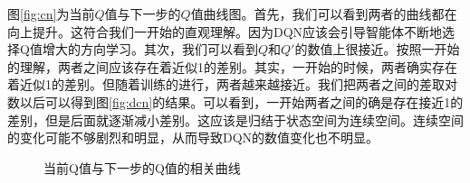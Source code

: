 \documentclass{article}
\begin{document}
        图\ref{fig:cn}为当前$Q$值与下一步的$Q$值曲线图。首先，我们可以看到两者的曲线都在向上提升。这符合我们一开始的直观理解。因为DQN应该会引导智能体不断地选择Q值增大的方向学习。其次，我们可以看到$Q$和$Q'$的数值上很接近。按照一开始的理解，两者之间应该存在着近似1的差别。其实，一开始的时候，两者确实存在着近似1的差别。但随着训练的进行，两者越来越接近。我们把两者之间的差取对数以后可以得到图\ref{fig:dcn}的结果。可以看到，一开始两者之间的确是存在接近1的差别，但是后面就逐渐减小差别。这应该是归结于状态空间为连续空间。连续空间的变化可能不够剧烈和明显，从而导致DQN的数值变化也不明显。
        \begin{figure}[htb]
            \centering
            \caption{当前Q值与下一步的Q值的相关曲线}
        \end{figure}
\end{document}
